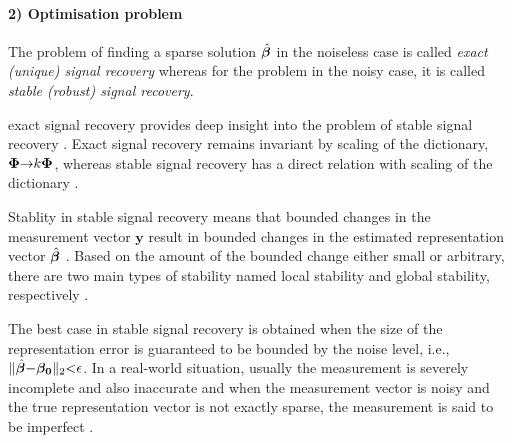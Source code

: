\paragraph{2) Optimisation problem}
The problem of finding a sparse solution $\hat{\boldsymbol{\beta}}$ in the noiseless case is called \emph{exact (unique) signal recovery} whereas for the problem in the noisy case, it is called \emph{stable (robust) signal recovery}. 

 exact signal recovery provides deep insight into the problem of stable signal recovery \cite{Cand`es2005b,Cand`es2007a,Donoho2004,Donoho2004a}. 
Exact signal recovery remains invariant by scaling of the dictionary, $\boldsymbol{\Phi} {\to} k \boldsymbol{\Phi}$, whereas stable signal recovery has a direct relation with scaling of the dictionary \cite{Davies2008,Foucart2009a}.

Stablity in stable signal recovery means that bounded changes in the measurement vector $\boldsymbol{y}$ result in bounded changes in the estimated representation vector $\hat{\boldsymbol{\beta}}$ \cite{Cand`es2006}. 
Based on the amount of the bounded change either small or arbitrary, there are two main types of stability named local stability and global stability, respectively \cite{Donoho2006a}. 

The best case in stable signal recovery is obtained when the size of the representation error is guaranteed to be bounded by the noise level, i.e., $\Vert \hat{\boldsymbol{\beta}} {-} \boldsymbol{\beta_0} \Vert_2 {<} \epsilon$.
In a real-world situation, usually the measurement is severely incomplete and also inaccurate and when the measurement vector is noisy and the true representation vector is not exactly sparse, the measurement is said to be imperfect \cite{Cand`es2006}.

